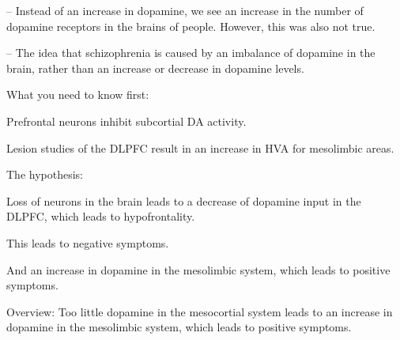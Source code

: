 \begin{coloredlist}
\begin{coloredlist}
\begin{coloredlist}
\begin{coloredlist}
                \begin{coloredlist}
                    \item {} -- Instead of an increase in dopamine, we see an increase in the number of dopamine receptors in the brains of people. However, this was also not true.
                \end{coloredlist}
                \item {} -- The idea that schizophrenia is caused by an imbalance of dopamine in the brain, rather than an increase or decrease in dopamine levels.
                \begin{coloredlist}
                    \item What you need to know first:
                    \begin{coloredlist}
                        \item Prefrontal neurons inhibit subcortial DA activity.
                        \begin{coloredlist}
                            \item Lesion studies of the DLPFC result in an increase in HVA for mesolimbic areas.
                        \end{coloredlist}
                    \end{coloredlist}
                    \item The hypothesis:
                    \begin{coloredlist}
                        \item Loss of neurons in the brain leads to a decrease of dopamine input in the DLPFC, which leads to hypofrontality.
                        \begin{coloredlist}
                            \item This leads to negative symptoms.
                            \item And an increase in dopamine in the mesolimbic system, which leads to positive symptoms.
                        \end{coloredlist}
                        \item Overview: Too little dopamine in the mesocortial system leads to an increase in dopamine in the mesolimbic system, which leads to positive symptoms.
                    \end{coloredlist}
                \end{coloredlist}
            \end{coloredlist}
        \end{coloredlist}
    \end{coloredlist}
\end{coloredlist}

